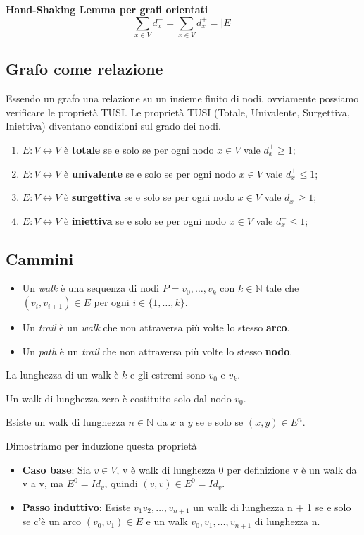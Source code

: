 \documentclass{article}
\begin{document}
\noindent\textbf{Hand-Shaking Lemma per grafi orientati}
\[\sum_{x \in V} d_x^- = \sum_{x \in V} d_x^+ = \lvert E \rvert\]

\subsection{Grafo come relazione}
Essendo un grafo una relazione su un insieme finito di nodi, ovviamente possiamo verificare le proprietà TUSI.
Le proprietà TUSI (Totale, Univalente, Surgettiva, Iniettiva) diventano condizioni sul grado dei nodi.
\begin{enumerate}
    \item \(E: V \leftrightarrow V\) è \textbf{totale} se e solo se per ogni nodo \(x \in V\) vale \(d_x^+ \geq 1\);
    \item \(E: V \leftrightarrow V\) è \textbf{univalente} se e solo se per ogni nodo \(x \in V\) vale \(d_x^+ \leq 1\);
    \item \(E: V \leftrightarrow V\) è \textbf{surgettiva} se e solo se per ogni nodo \(x \in V\) vale \(d_x^- \geq 1\);
    \item \(E: V \leftrightarrow V\) è \textbf{iniettiva} se e solo se per ogni nodo \(x \in V\) vale \(d_x^- \leq 1\);
\end{enumerate}

\subsection{Cammini}
\begin{itemize}
    \item Un \emph{walk} è una sequenza di nodi \(P = v_0, \ldots, v_k\) con \(k \in \mathbb{N}\) tale che \((v_i,v_{i+1}) \in E\) per ogni \(i \in \{1,\ldots,k\}\).
    \item Un \emph{trail} è un \emph{walk} che non attraversa più volte lo stesso \textbf{arco}.
    \item Un \emph{path} è un \emph{trail} che non attraversa più volte lo stesso \textbf{nodo}.
\end{itemize}

La lunghezza di un walk è \(k\) e gli estremi sono \(v_0\) e \(v_k\).

Un walk di lunghezza zero è costituito solo dal nodo \(v_0\).

Esiste un walk di lunghezza \(n \in \mathbb{N}\) da \(x\) a \(y\) se e solo se \((x,y) \in E^n\).

\begin{dms}
    Dimostriamo per induzione questa proprietà
    \begin{itemize}
        \item \textbf{Caso base}: Sia \(v \in V\), v è walk di lunghezza 0 per definizione v è un walk da v a v, ma \(E^0 = Id_v\), quindi \((v,v) \in E^0 = Id_v\).
        \item \textbf{Passo induttivo}: Esiste \(v_1 v_2, \ldots, v_{n+1}\) un walk di lunghezza n + 1 se e solo se c'è un arco \((v_0,v_1) \in E\) e un walk \(v_0, v_1, \ldots, v_{n+1}\) di lunghezza n.
    \end{itemize}
\end{dms}
\end{document}
